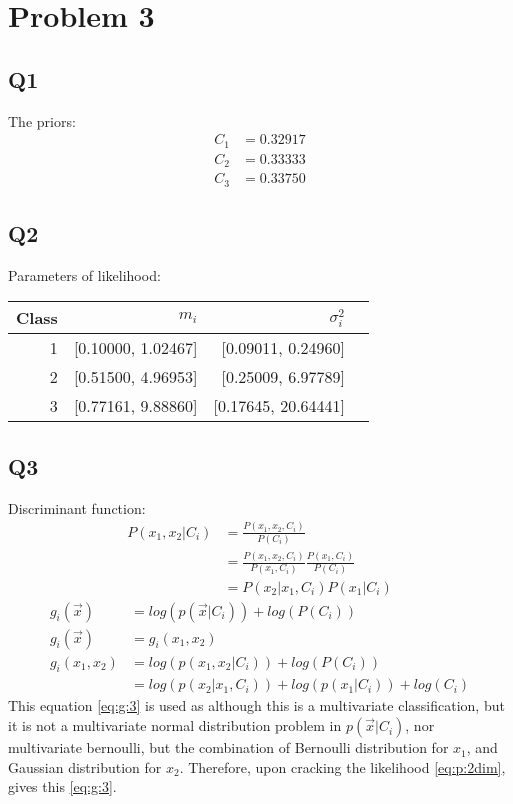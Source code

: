 \documentclass{subfiles}
\begin{document}
  \section{Problem 3}
  \subsection{Q1}
  The priors:
  \begin{equation*}
    \begin{split}
      C_1 &= 0.32917\\
      C_2 &= 0.33333\\
      C_3 &= 0.33750
    \end{split}
  \end{equation*}\cite{2020SciPy-NMeth}
  \subsection{Q2}
  Parameters of likelihood:
  \begin{tabular}{|r|r|r|r|}
    \hline
    Class & \(m_i\) & \(\sigma^2_i\)\\
    \hline
    1 & [0.10000, 1.02467] & [0.09011, 0.24960]\\
    \hline
    2 & [0.51500, 4.96953] & [0.25009, 6.97789]\\
    \hline
    3 & [0.77161, 9.88860] & [0.17645, 20.64441]\\
    \hline
  \end{tabular}\cite{2020SciPy-NMeth}
  \subsection{Q3}
  Discriminant function:
  \begin{equation}
    \begin{split}
      P(x_1,x_2|C_i) &= \frac{P(x_1,x_2,C_i)}{P(C_i)}\\
      &= \frac{P(x_1,x_2,C_i)}{P(x_1,C_i)} \frac{P(x_1,C_i)}{P(C_i)}\\
      &= P(x_2|x_1,C_i) P(x_1|C_i) \label{eq:p:2dim}
    \end{split}
  \end{equation}
  \begin{equation}
    \begin{split}
      g_i(\vec{x}) &= log(p(\vec{x}|C_i)) + log(P(C_i))\\
      g_i(\vec{x}) &= g_i(x_1, x_2)\\
      g_i(x_1, x_2) &= log(p(x_1, x_2|C_i)) + log(P(C_i))\\
      &= log(p(x_2|x_1, C_i)) + log(p(x_1|C_i)) + log(C_i) \label{eq:g:3}
    \end{split}
  \end{equation}
  This equation \ref{eq:g:3} is used as although this is a multivariate classification, but it is not a multivariate normal distribution problem in \(p(\vec{x}|C_i)\), nor multivariate bernoulli, but the combination of Bernoulli distribution for \(x_1\), and Gaussian distribution for \(x_2\). Therefore, upon cracking the likelihood \ref{eq:p:2dim}, gives this \ref{eq:g:3}.
\end{document}

